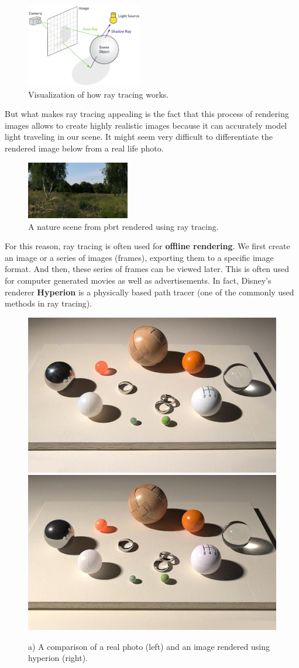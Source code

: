 \documentclass[11pt,a4paper]{article}
\begin{document}
\begin{figure}[H]
	\centering
	\captionsetup{justification=centering,margin=2cm}
	\includegraphics[width=0.45\textwidth]{raytracing_gems}
	\caption{Visualization of how ray tracing works. \protect\cite{haines2019ray}}
\end{figure}
\noindent
But what makes ray tracing appealing
is the fact that this process of rendering images allows to create highly realistic images because it can accurately
model light traveling in our scene. It might seem very difficult to differentiate the rendered image below from a real life photo.

\begin{figure}[H]
	\centering
	\captionsetup{justification=centering,margin=2cm}
	\includegraphics[width=0.4\textwidth]{landing}
	\caption{A nature scene from pbrt rendered using ray tracing. \protect\cite{pharr2016physically}}
\end{figure}

\noindent
For this reason, ray tracing is often used for \textbf{offline rendering}. We first create an image or a series of images (frames), exporting them to a specific image format. And then, these series of frames can be viewed later. This is often used for computer generated movies as well as advertisements. In fact, Disney's renderer \textbf{Hyperion} is a physically based path tracer (one of the commonly used methods in ray tracing). 

\begin{figure}[H]
	\centering
	\captionsetup{justification=centering}
	\includegraphics[width=.35\textwidth]{real_photo}\quad
	\includegraphics[width=.35\textwidth]{hyperion}\quad
	\caption{a) A comparison of a real photo (left) and an image rendered using hyperion (right). \protect\cite{burley2018design}}
\end{figure}
\end{document}
